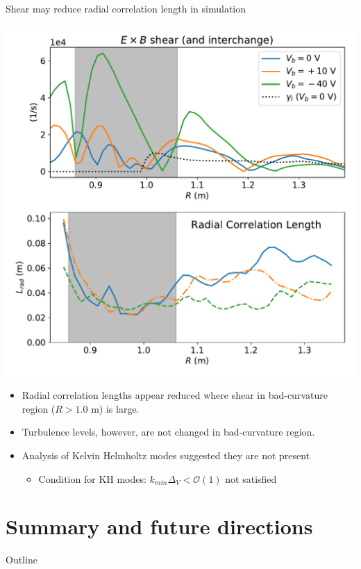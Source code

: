 \documentclass[12pt,table]{beamer}
\begin{document}
\begin{frame}{Shear may reduce radial correlation length in simulation}
    \begin{minipage}{.5\linewidth}
        \includegraphics[width=\linewidth]{figs/lrad-comp-sim.pdf}
    \end{minipage}%
    \begin{minipage}{.49\linewidth}
    \begin{itemize} \footnotesize
        \item Radial correlation lengths appear reduced where shear in bad-curvature region ($R > 1.0$ m) is large.
        \item Turbulence levels, however, are not changed in bad-curvature region.
        \item Analysis of Kelvin Helmholtz modes suggested they are not present
        \begin{itemize} \footnotesize
            \item Condition for KH modes: $k_{min}\Delta_V  < \mathcal{O}(1)$ not satisfied
        \end{itemize}
    \end{itemize}
    \end{minipage}
\end{frame}

\section{Summary and future directions}
\begin{frame}{Outline}
    \tableofcontents[currentsection] 
\end{frame}
\end{document}
